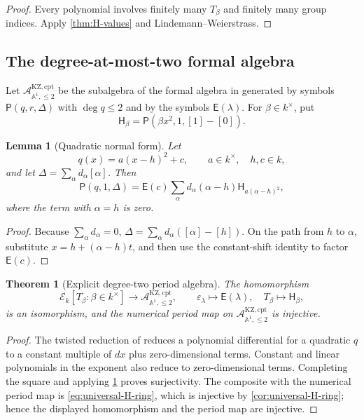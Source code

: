 \documentclass[11pt]{article}
\numberwithin{equation}{section}
\newtheorem{theorem}{Theorem}[section]
\newtheorem{lemma}[lemma]{Lemma}
\theoremstyle{definition}
\theoremstyle{remark}
\newcommand{\Aone}{\mathbb A^1}
\newcommand{\Acal}{\mathcal A}
\begin{document}
\begin{proof}
Every polynomial involves finitely many $T_\beta$ and finitely many group
indices.  Apply \cref{thm:H-values} and Lindemann--Weierstrass.
\end{proof}

\subsection{The degree-at-most-two formal algebra}

Let $\Acal_{\Aone,\le2}^{\mathrm{KZ,cpt}}$ be the subalgebra of the formal
algebra in \cite{LongPolynomialKZ} generated by symbols
$\mathsf P(q,r,\Delta)$ with $\deg q\le2$ and by the symbols
$\mathsf E(\lambda)$.  For $\beta\in k^\times$, put
\[
  \mathsf H_\beta
  =\mathsf P(\beta x^2,1,[1]-[0]).
\]

\begin{lemma}[Quadratic normal form]\label{lem:quadratic-normal-form}
Let
\[
  q(x)=a(x-h)^2+c,
  \qquad a\in k^\times,
  \quad h,c\in k,
\]
and let $\Delta=\sum_\alpha d_\alpha[\alpha]$.  Then
\begin{equation}\label{eq:quadratic-normal-form}
  \mathsf P(q,1,\Delta)
  =\mathsf E(c)
   \sum_\alpha d_\alpha(\alpha-h)
      \mathsf H_{a(\alpha-h)^2},
\end{equation}
where the term with $\alpha=h$ is zero.
\end{lemma}

\begin{proof}
Because $\sum_\alpha d_\alpha=0$,
$\Delta=\sum_\alpha d_\alpha([\alpha]-[h])$.  On the path from $h$ to
$\alpha$, substitute $x=h+(\alpha-h)t$, and then use the constant-shift
identity to factor $\mathsf E(c)$.
\end{proof}

\begin{theorem}[Explicit degree-two period algebra]
\label{thm:degree-two-algebra}
The homomorphism
\[
  \mathscr E_k[T_\beta:\beta\in k^\times]
  \longrightarrow
  \Acal_{\Aone,\le2}^{\mathrm{KZ,cpt}},
  \qquad
  \varepsilon_\lambda\longmapsto\mathsf E(\lambda),
  \quad
  T_\beta\longmapsto\mathsf H_\beta,
\]
is an isomorphism, and the numerical period map on
$\Acal_{\Aone,\le2}^{\mathrm{KZ,cpt}}$ is injective.
\end{theorem}

\begin{proof}
The twisted reduction of \cite{LongLinearKZ} reduces a polynomial
differential for a quadratic $q$ to a constant multiple of $dx$ plus
zero-dimensional terms.  Constant and linear polynomials in the exponent
also reduce to zero-dimensional terms.  Completing the square and applying
\cref{lem:quadratic-normal-form} proves surjectivity.  The composite with the
numerical period map is \eqref{eq:universal-H-ring}, which is injective by
\cref{cor:universal-H-ring}; hence the displayed homomorphism and the period
map are injective.
\end{proof}
\end{document}
